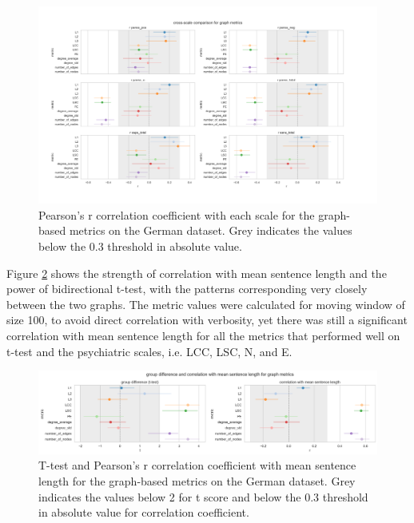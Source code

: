 \begin{figure}[h!]
    \includegraphics[width=1.2\textwidth, center]{Figures/chapter_4/graph/de_scale_r.png} 
\captionsetup{width=\textwidth}
\caption[Graph Metrics: German]{\label{fig:results:graph:de} Pearson's r correlation coefficient with each scale for the graph-based metrics on the German dataset. Grey indicates the values below the 0.3 threshold in absolute value.}
\end{figure}

Figure \ref{fig:results:graph:de:ttest} shows the strength of correlation with mean sentence length and the power of bidirectional t-test, with the patterns corresponding very closely between the two graphs. The metric values were calculated for moving window of size 100, to avoid direct correlation with verbosity, yet there was still a significant correlation with mean sentence length for all the metrics that performed well on t-test and the psychiatric scales, i.e. LCC, LSC, N, and E. 

\begin{figure}[ht!]
    \includegraphics[width=\textwidth, center]{Figures/chapter_4/graph/de_t_test_corr_len.png} 
\captionsetup{width=\textwidth}
\caption[Graph Metrics: German (T-Test)]{\label{fig:results:graph:de:ttest} T-test and Pearson's r correlation coefficient with mean sentence length for the graph-based metrics on the German dataset. Grey indicates the values below 2 for t score and below the 0.3 threshold in absolute value for correlation coefficient.}
\end{figure}

